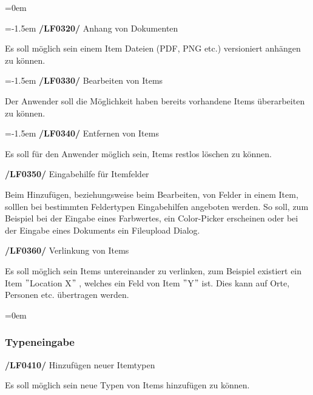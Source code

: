 \documentclass[11pt,a4paper]{report}
\begin{document}
\leftskip=0em

\leftskip=-1.5em
\textbf{/LF0320/} Anhang von Dokumenten
\par
\begingroup
\leftskip=1cm
\noindent Es soll möglich sein einem Item Dateien (PDF, PNG etc.) versioniert anhängen zu können.\\
\par
\endgroup

\leftskip=-1.5em
\textbf{/LF0330/} Bearbeiten von Items
\par
\begingroup
\leftskip=1cm
\noindent Der Anwender soll die Möglichkeit haben bereits vorhandene Items überarbeiten zu können.\\
\par
\endgroup

\leftskip=-1.5em
\textbf{/LF0340/} Entfernen von Items
\par
\begingroup
\leftskip=1cm
\noindent Es soll für den Anwender möglich sein, Items restlos löschen zu können.\\
\par
\endgroup

\textbf{/LF0350/} Eingabehilfe für Itemfelder
\par
\begingroup
\leftskip=1cm
\noindent Beim Hinzufügen, beziehungsweise beim Bearbeiten, von Felder in einem Item, solllen bei bestimmten Feldertypen Eingabehilfen angeboten werden.
So soll, zum Beispiel bei der Eingabe eines Farbwertes, ein Color-Picker erscheinen oder bei der Eingabe eines Dokuments ein Fileupload Dialog.\\
\par
\endgroup

\textbf{/LF0360/} Verlinkung von Items
\par
\begingroup
\leftskip=1cm
\noindent Es soll möglich sein Items untereinander zu verlinken, zum Beispiel existiert ein Item $"$Location X$"$ , welches ein Feld von Item $"$Y$"$ ist.
Dies kann auf Orte, Personen etc. übertragen werden.\\
\par
\endgroup

\leftskip=0em
\subsubsection{Typeneingabe}

\textbf{/LF0410/} Hinzufügen neuer Itemtypen
\par
\begingroup
\leftskip=1cm
\noindent Es soll möglich sein neue Typen von Items hinzufügen zu können.\\
\par
\endgroup
\end{document}

